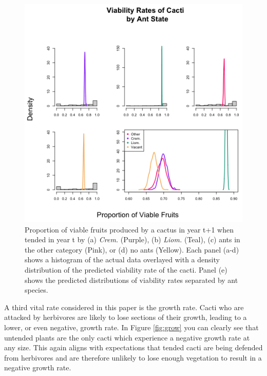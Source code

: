 \documentclass[12pt,a4paper]{article}
\begin{document}
\begin{figure}[!ht]
	\centering
	\includegraphics{Figures/viab_hist.png}
	\caption{Proportion of viable fruits produced by a cactus in year t+1 when tended in year t by (a) \textit{Crem.} (Purple), (b) \textit{Liom.} (Teal), (c) ants in the other category (Pink), or (d) no ants (Yellow). Each panel (a-d) shows a histogram of the actual data overlayed with a density distribution of the predicted viability rate of the cacti. Panel (e) shows the predicted distributions of viability rates separated by ant species.}
	\label{fig:viab}
\end{figure}

A third vital rate considered in this paper is the growth rate. Cacti who are attacked by herbivores are likely to lose sections of their growth, leading to a lower, or even negative, growth rate. In Figure \ref{fig:grow} you can clearly see that untended plants are the only cacti which experience a negative growth rate at any size. This again aligns with expectations that tended cacti are being defended from herbivores and are therefore unlikely to lose enough vegetation to result in a negative growth rate. 
\end{document}
